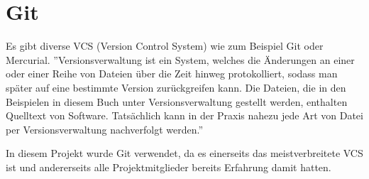 \renewcommand{\kapitelautor}{Autor: Felix Zwickelstorfer}

\section{Git}\label{sec:git}

Es gibt diverse VCS (Version Control System) wie zum Beispiel Git oder Mercurial.
''Versionsverwaltung ist ein System, welches die Änderungen an einer oder einer Reihe von Dateien über die Zeit hinweg protokolliert, sodass man später auf eine bestimmte Version zurückgreifen kann.
Die Dateien, die in den Beispielen in diesem Buch unter Versionsverwaltung gestellt werden, enthalten Quelltext von Software.
Tatsächlich kann in der Praxis nahezu jede Art von Datei per Versionsverwaltung nachverfolgt werden.''

In diesem Projekt wurde Git verwendet, da es einerseits das meistverbreitete VCS ist und andererseits alle Projektmitglieder bereits Erfahrung damit hatten.




